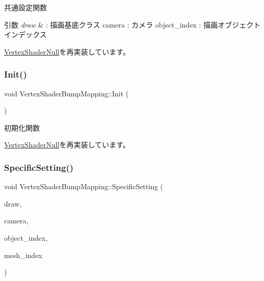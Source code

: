 共通設定関数 


\begin{DoxyParams}{引数}
{\em draw} & \+: 描画基底クラス camera \+: カメラ object\+\_\+index \+: 描画オブジェクトインデックス \\
\hline
\end{DoxyParams}


\mbox{\hyperlink{class_vertex_shader_null_a95f1a66045fb39c42cf0566f1990b6a1}{Vertex\+Shader\+Null}}を再実装しています。

\mbox{\label{class_vertex_shader_bump_mapping_a6c0f59d1f29fd883943a66bfe61b6b03}} 
\subsubsection{\texorpdfstring{Init()}{Init()}}
{\footnotesize\ttfamily void Vertex\+Shader\+Bump\+Mapping\+::\+Init (\begin{DoxyParamCaption}{ }\end{DoxyParamCaption})\hspace{0.3cm}{\ttfamily [virtual]}}



初期化関数 



\mbox{\hyperlink{class_vertex_shader_null_af30eb8057fe0537bc6ade214647b6fb5}{Vertex\+Shader\+Null}}を再実装しています。

\mbox{\label{class_vertex_shader_bump_mapping_ad81d57336763441c4071f967b57dbce1}} 
\subsubsection{\texorpdfstring{Specific\+Setting()}{SpecificSetting()}}
{\footnotesize\ttfamily void Vertex\+Shader\+Bump\+Mapping\+::\+Specific\+Setting (\begin{DoxyParamCaption}\item[{\mbox{\hyperlink{class_draw_base}{Draw\+Base}} $\ast$}]{draw,  }\item[{\mbox{\hyperlink{class_camera}{Camera}} $\ast$}]{camera,  }\item[{unsigned}]{object\+\_\+index,  }\item[{unsigned}]{mesh\+\_\+index }\end{DoxyParamCaption})\hspace{0.3cm}{\ttfamily [virtual]}}




